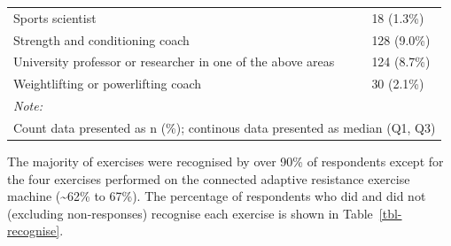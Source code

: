 \documentclass[
]{article}
\begin{document}
\begin{longtable}[t]{ll}
\hspace{1em}\hspace{1em}Sports scientist & 18 (1.3\%)\\
\hspace{1em}\hspace{1em}Strength and conditioning coach & 128 (9.0\%)\\
\hspace{1em}\hspace{1em}University professor or researcher in one of the above areas & 124 (8.7\%)\\
\hspace{1em}\hspace{1em}Weightlifting or powerlifting coach & 30 (2.1\%)\\
\bottomrule
\multicolumn{2}{l}{\rule{0pt}{1em}\textit{Note: }}\\
\multicolumn{2}{l}{\rule{0pt}{1em}Count data presented as n (\%); continous data presented as median (Q1, Q3)}\\

\end{longtable}

The majority of exercises were recognised by over 90\% of respondents
except for the four exercises performed on the connected adaptive
resistance exercise machine (\textasciitilde62\% to 67\%). The
percentage of respondents who did and did not (excluding non-responses)
recognise each exercise is shown in Table~\ref{tbl-recognise}.
\end{document}
